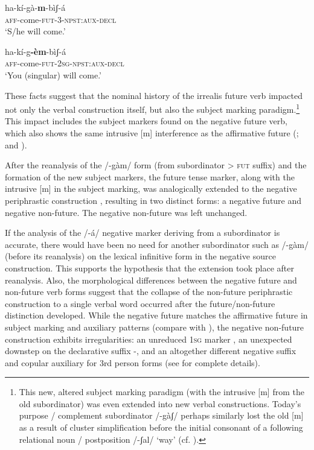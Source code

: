\documentclass[output=paper]{langsci/langscibook}
\begin{document}
\ea\label{ex:mahland:81}
\gll ha-kí-gà-\textbf{m}{}-bìʃ-á   \\
\textsc{aff}{}-come-\textsc{fut-3-npst:aux-decl} \\
\glt `S/he will come.'
\z

\ea\label{ex:mahland:82}
\gll ha-kí-g\textbf{{}-èm}{}-bìʃ-á  \\
\textsc{aff}{}-come-\textsc{fut-2sg-npst:aux-decl} \\
\glt `You (singular) will come.'
\z

These facts suggest that the nominal history of the irrealis future verb impacted not only the verbal construction itself, but also the subject marking paradigm.\footnote{This new, altered subject marking paradigm (with the intrusive [m] from the old subordinator) was even extended into new verbal constructions. Today's purpose / complement subordinator /-gàʃ/ perhaps similarly lost the old [m] as a result of cluster simplification before the initial consonant of a following relational noun / postposition /-ʃal/ `way' (cf. \citealt[14]{Ahland2014b}).}  This impact includes the subject markers found on the negative future verb, which also shows the same intrusive [m] interference as the affirmative future (; and \citealt[385]{Ahland2012}). 

After the reanalysis of the /-gàm/ form (from subordinator {>} \textsc{fut} suffix) and the formation of the new subject markers, the future tense marker, along with the intrusive [m] in the subject marking, was analogically extended to the negative periphrastic construction , resulting in two distinct forms: a negative future and negative non-future. The negative non-future was left unchanged. 

If the analysis of the /-á/ negative marker deriving from a subordinator is accurate, there would have been no need for another subordinator such as /-gàm/ (before its reanalysis) on the lexical infinitive form in the negative source construction. This supports the hypothesis that the extension took place after reanalysis. Also, the morphological differences between the negative future and non-future verb forms suggest that the collapse of the non-future periphrastic construction to a single verbal word occurred after the future/non-future distinction developed. While the negative future matches the affirmative future in subject marking and auxiliary patterns (compare  with ), the negative non-future construction exhibits irregularities: an unreduced \textsc{1sg} marker , an unexpected downstep on the declarative suffix -, and an altogether different negative suffix and copular auxiliary for 3rd person forms  (see \citealt[384-384]{Ahland2012} for complete details). 
\end{document}
